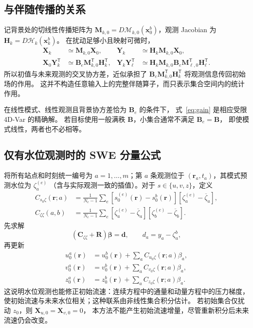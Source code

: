 \documentclass[11pt,a4paper]{article}
\newcommand{\T}{\mathsf T}
\newcommand{\xx}{\mathbf x}
\newcommand{\dd}{\mathbf d}
\begin{document}
\subsection{与伴随传播的关系}

记背景处的切线性传播矩阵为
$\mathbf M_{k,0}=D\mathcal M_{k,0}(\xx_0^b)$，观测 Jacobian 为
$\mathbf H_k=D\mathcal H_k(\xx_k^b)$。
在扰动足够小且映射可微时，
\begin{align}
 \mathbf X_k&\simeq\mathbf M_{k,0}\mathbf X_0,&
 \mathbf Y_k&\simeq\mathbf H_k\mathbf M_{k,0}\mathbf X_0,\\
 \mathbf X_0\mathbf Y_k^\T
 &\simeq\mathbf B_e\mathbf M_{k,0}^\T\mathbf H_k^\T,&
 \mathbf Y_k\mathbf Y_\ell^\T
 &\simeq\mathbf H_k\mathbf M_{k,0}\mathbf B_e
 \mathbf M_{\ell,0}^\T\mathbf H_\ell^\T.
 \label{eq:adjointlink}
\end{align}
所以初值与未来观测的交叉协方差，近似承担了
$\mathbf B_e\mathbf M_{k,0}^\T\mathbf H_k^\T$ 将观测信息传回初始场的作用。
这并不构造任意输入上的完整伴随算子，而只表示集合空间内的统计作用。

在线性模式、线性观测且背景协方差恰为 $\mathbf B_e$ 的条件下，
式~\eqref{eq:gain} 是相应受限 4D-Var 的精确解。
若目标使用一般满秩 $\mathbf B$，小集合通常不满足 $\mathbf B_e=\mathbf B$，
即使模式线性，两者也不必相等。

\subsection{仅有水位观测时的 SWE 分量公式}

将所有站点和时刻统一编号为 $a=1,\ldots,m$；第 $a$ 条观测位于
$(\mathbf r_a,t_a)$，其模式预测水位为 $\zeta_a^{(e)}$
（含与实际观测一致的插值）。对于 $s\in\{u,v,z\}$，定义
\begin{align}
 C_{s_0\zeta}(\mathbf r;a)
 &=\frac1{N_e-1}\sum_e
 [s_0^{(e)}(\mathbf r)-s_0^b(\mathbf r)]
 [\zeta_a^{(e)}-\overline\zeta_a],\\
 C_{\zeta\zeta}(a,b)
 &=\frac1{N_e-1}\sum_e
 [\zeta_a^{(e)}-\overline\zeta_a]
 [\zeta_b^{(e)}-\overline\zeta_b].
\end{align}
先求解
\begin{equation}
 (\mathbf C_{\zeta\zeta}+\mathbf R)\bm\beta=\dd,
 \qquad d_a=y_a-\zeta_a^b,
 \label{eq:beta}
\end{equation}
再更新
\begin{equation}
 \boxed{
 \begin{aligned}
 u_0^a(\mathbf r)&=u_0^b(\mathbf r)+\sum_a C_{u_0\zeta}(\mathbf r;a)\beta_a,\\
 v_0^a(\mathbf r)&=v_0^b(\mathbf r)+\sum_a C_{v_0\zeta}(\mathbf r;a)\beta_a,\\
 z_0^a(\mathbf r)&=z_0^b(\mathbf r)+\sum_a C_{z_0\zeta}(\mathbf r;a)\beta_a.
 \end{aligned}}
 \label{eq:component}
\end{equation}
这说明水位观测也能修正初始流速：连续方程中的通量和动量方程中的压力梯度，
使初始流速与未来水位相关；这种联系由非线性集合积分估计。
若初始集合仅扰动 $z_0$，则 $\mathbf X_{u,0}=\mathbf X_{v,0}=0$，
本方法不能产生初始流速增量，尽管重新积分后未来流速仍会改变。
\end{document}
